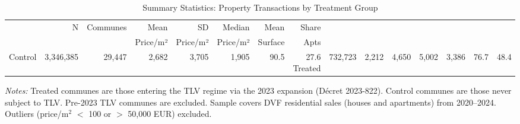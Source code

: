 \begin{table}[htbp]
\centering
\caption{Summary Statistics: Property Transactions by Treatment Group}
\label{tab:summary}
\begin{tabular}{lrrrrrrr}
\toprule
 & N & Communes & Mean & SD & Median & Mean & Share \\
 & & & Price/m² & Price/m² & Price/m² & Surface & Apts \\
\midrule
Control & 3,346,385 & 29,447 & 2,682 & 3,705 & 1,905 & 90.5 & 27.6%
Treated &   732,723 &  2,212 & 4,650 & 5,002 & 3,386 & 76.7 & 48.4%
\bottomrule
\end{tabular}
\begin{tablenotes}[flushleft]\small
\item \textit{Notes:} Treated communes are those entering the TLV regime via the 2023 expansion (D\'ecret 2023-822). Control communes are those never subject to TLV. Pre-2023 TLV communes are excluded. Sample covers DVF residential sales (houses and apartments) from 2020--2024. Outliers (price/m$^2$ $<$ 100 or $>$ 50,000 EUR) excluded.
\end{tablenotes}
\end{table}
